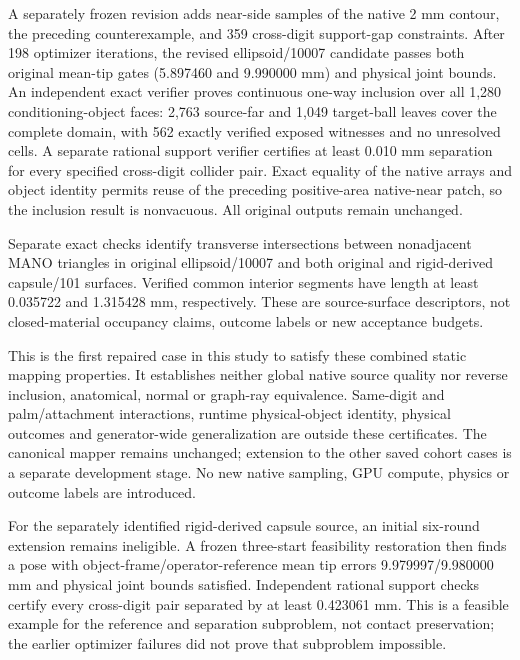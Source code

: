 \documentclass[10pt,letterpaper]{article}
\begin{document}
A separately frozen revision adds near-side samples of the native 2 mm
contour, the preceding counterexample, and 359 cross-digit support-gap
constraints. After 198 optimizer iterations, the revised ellipsoid/10007
candidate passes both original mean-tip gates (5.897460 and 9.990000 mm)
and physical joint bounds. An independent exact verifier proves continuous
one-way inclusion over all 1,280 conditioning-object faces: 2,763 source-far
and 1,049 target-ball leaves cover the complete domain, with 562 exactly
verified exposed witnesses and no unresolved cells. A separate rational
support verifier certifies at least 0.010 mm separation for every specified
cross-digit collider pair. Exact equality of the native arrays and object
identity permits reuse of the preceding positive-area native-near patch,
so the inclusion result is nonvacuous. All original outputs remain unchanged.

Separate exact checks identify transverse intersections between nonadjacent
MANO triangles in original ellipsoid/10007 and both original and rigid-derived
capsule/101 surfaces. Verified common interior segments have length at least
0.035722 and 1.315428 mm, respectively. These are source-surface descriptors,
not closed-material occupancy claims, outcome labels or new acceptance budgets.

This is the first repaired case in this study to satisfy these combined
static mapping properties. It establishes neither global native source quality
nor reverse inclusion, anatomical, normal or graph-ray equivalence.
Same-digit and palm/attachment interactions,
runtime physical-object identity, physical outcomes and generator-wide
generalization are outside these certificates. The canonical mapper remains
unchanged; extension to the other saved cohort cases is a separate development
stage. No new native sampling, GPU compute, physics or outcome labels are
introduced.

For the separately identified rigid-derived capsule source, an initial six-round
extension remains ineligible. A frozen three-start feasibility restoration then
finds a pose with object-frame/operator-reference mean tip errors
9.979997/9.980000 mm and physical joint bounds satisfied. Independent rational
support checks certify every cross-digit pair separated by at least 0.423061 mm.
This is a feasible example for the reference and separation subproblem, not
contact preservation; the earlier optimizer failures did not prove that
subproblem impossible.
\end{document}
